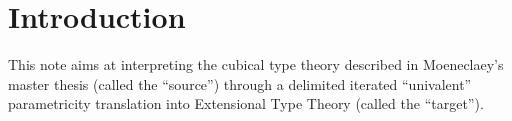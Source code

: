 \documentclass{article}
\makeatletter
\newcommand{\Overrightarrow}[2]{\raisebox{#1}{$\ext@arrow 0359\Rightarrowfill@{\mbox{${#2}$}}{}$}}
\newcommand{\Overleftarrow}[2]{\raisebox{#1}{$\ext@arrow 0359\Leftarrowfill@{\mbox{${#2}$}}{}$}}
\makeatother
\begin{document}
\newcommand{\Reglr}{\Rightarrow-\mathsf{reg}}
\newcommand{\Regrl}{\Leftarrow-\mathsf{reg}}
\newcommand{\Coercivelr}{\Rightarrow-\mathsf{def}}
\newcommand{\Coerciverl}{\Leftarrow-\mathsf{def}}
\newcommand{\Regularitylr}{\Rightarrow-\mathsf{regularity}}
\newcommand{\Regularityrl}{\Leftarrow-\mathsf{regularity}}
\newcommand{\coebacklr}{\overrightarrow{\mathsf{coe}}}
\newcommand{\coebackrl}{\overleftarrow{\mathsf{coe}}}
\newcommand{\backcoercivelr}{\overrightarrow{\mathsf{coe}}-\mathsf{def}}
\newcommand{\backcoerciverl}{\overleftarrow{\mathsf{coe}}-\mathsf{def}}
\newcommand{\regbacklr}{\overrightarrow{\mathsf{coe}}-\mathsf{reg}}
\newcommand{\regbackrl}{\overleftarrow{\mathsf{coe}}-\mathsf{reg}}
\newcommand{\regularitybacklr}{\overrightarrow{\mathsf{coe}}-\mathsf{regularity}}
\newcommand{\regularitybackrl}{\overleftarrow{\mathsf{coe}}-\mathsf{regularity}}
\newcommand{\Coebacklr}{\Overrightarrow{1ex}{\mathsf{coe}}}
\newcommand{\Coebackrl}{\Overleftarrow{1ex}{\mathsf{coe}}}
\newcommand{\Coercivebacklr}{\Overrightarrow{1ex}{\mathsf{coe}}-\mathsf{def}}
\newcommand{\Coercivebackrl}{\Overleftarrow{1ex}{\mathsf{coe}}-\mathsf{def}}
\newcommand{\Regbacklr}{\Overrightarrow{1ex}{\mathsf{coe}}-\mathsf{reg}}
\newcommand{\Regbackrl}{\Overleftarrow{1ex}{\mathsf{coe}}-\mathsf{reg}}
\newcommand{\Regularitybacklr}{\Overrightarrow{1ex}{\mathsf{coe}}-\mathsf{regularity}}
\newcommand{\Regularitybackrl}{\Overleftarrow{1ex}{\mathsf{coe}}-\mathsf{regularity}}

\newcommand{\reflbox}{\mathsf{reflbox}}
\newcommand{\refllayer}{\mathsf{refllayer}}
\newcommand{\reflcube}{\mathsf{reflcube}}
\newcommand{\permutebox}{\mathsf{permutebox}}
\newcommand{\diagbox}{\mathsf{diagbox}}
\newcommand{\connbox}{\mathsf{connbox}}
\newcommand{\hd}{\mathsf{hd}}
\newcommand{\tl}{\mathsf{tl}}
\newcommand{\first}{\mathsf{first}}
\newcommand{\groupoid}{\mathsf{groupoid}}
\newcommand{\groupoidn}{\mathsf{groupoidn}}
\newcommand{\letinsplit}[3]{\!\!\begin{array}{l}\mathbf{let}~{#1}=#2\;\mathbf{in}~\\#3\end{array}}

\tableofcontents

\section{Introduction}

This note aims at interpreting the cubical type theory described in
Moeneclaey's master thesis (called the ``source'') through a delimited iterated
``univalent'' parametricity translation into Extensional Type Theory
(called the ``target'').
\end{document}
